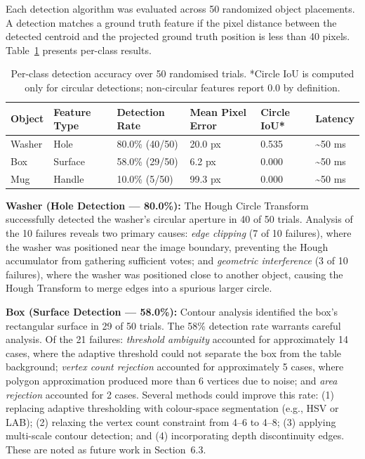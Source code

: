 \documentclass[11pt,a4paper]{article}
\begin{document}
Each detection algorithm was evaluated across 50 randomized object placements. A detection matches a ground truth feature if the pixel distance between the detected centroid and the projected ground truth position is less than 40 pixels. Table~\ref{tab:detection_accuracy} presents per-class results.

\begin{table}[H]
\centering
\caption{Per-class detection accuracy over 50 randomised trials. *Circle IoU is computed only for circular detections; non-circular features report 0.0 by definition.}
\label{tab:detection_accuracy}
\small
\begin{tabularx}{\textwidth}{l l X l l l}
\toprule
\textbf{Object} & \textbf{Feature Type} & \textbf{Detection Rate} & \textbf{Mean Pixel Error} & \textbf{Circle IoU*} & \textbf{Latency} \\
\midrule
Washer & Hole & 80.0\% (40/50) & 20.0 px & 0.535 & \textasciitilde50 ms \\
Box & Surface & 58.0\% (29/50) & 6.2 px & 0.000 & \textasciitilde50 ms \\
Mug & Handle & 10.0\% (5/50) & 99.3 px & 0.000 & \textasciitilde50 ms \\
\bottomrule
\end{tabularx}
\end{table}

\textbf{Washer (Hole Detection --- 80.0\%):} The Hough Circle Transform successfully detected the washer's circular aperture in 40 of 50 trials. Analysis of the 10 failures reveals two primary causes: \textit{edge clipping} (7 of 10 failures), where the washer was positioned near the image boundary, preventing the Hough accumulator from gathering sufficient votes; and \textit{geometric interference} (3 of 10 failures), where the washer was positioned close to another object, causing the Hough Transform to merge edges into a spurious larger circle.

\textbf{Box (Surface Detection --- 58.0\%):} Contour analysis identified the box's rectangular surface in 29 of 50 trials. The 58\% detection rate warrants careful analysis. Of the 21 failures: \textit{threshold ambiguity} accounted for approximately 14 cases, where the adaptive threshold could not separate the box from the table background; \textit{vertex count rejection} accounted for approximately 5 cases, where polygon approximation produced more than 6 vertices due to noise; and \textit{area rejection} accounted for 2 cases. Several methods could improve this rate: (1) replacing adaptive thresholding with colour-space segmentation (e.g., HSV or LAB); (2) relaxing the vertex count constraint from 4--6 to 4--8; (3) applying multi-scale contour detection; and (4) incorporating depth discontinuity edges. These are noted as future work in Section~6.3.
\end{document}
